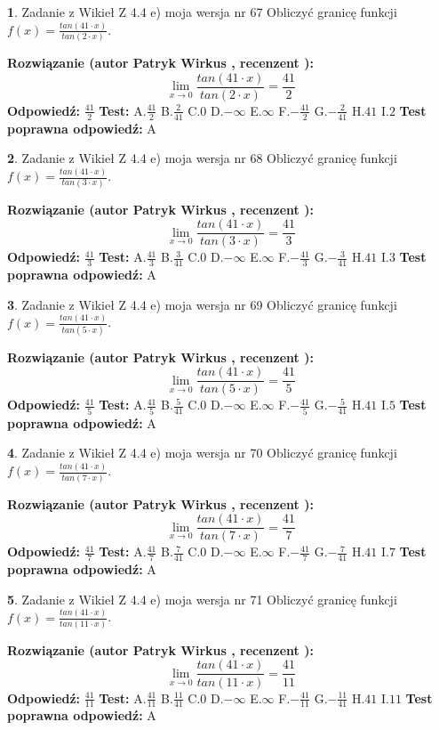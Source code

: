 \documentclass[12pt, a4paper]{article}
\theoremstyle{definition} %
\newtheorem{zad}{}
\newcommand{\zadStart}[1]{\begin{zad}#1\newline}
\newcommand{\zadStop}{\end{zad}}
\newcommand{\rozwStart}[2]{\noindent \textbf{Rozwiązanie (autor #1 , recenzent #2): }\newline}
\newcommand{\rozwStop}{\newline}
\newcommand{\odpStart}{\noindent \textbf{Odpowiedź:}\newline}
\newcommand{\odpStop}{\newline}
\newcommand{\testStart}{\noindent \textbf{Test:}\newline}
\newcommand{\testStop}{\newline}
\newcommand{\kluczStart}{\noindent \textbf{Test poprawna odpowiedź:}\newline}
\newcommand{\kluczStop}{\newline}
\begin{document}
\zadStart{Zadanie z Wikieł Z 4.4 e) moja wersja nr 67}
Obliczyć granicę funkcji $f(x)=\frac{tan(41\cdot x)}{tan(2\cdot x)}$.
\zadStop
\rozwStart{Patryk Wirkus}{}
$$\lim\limits_{x\to 0}\frac{tan(41\cdot x)}{tan(2\cdot x)}=
\frac{41}{2}$$
\rozwStop
\odpStart
$\frac{41}{2}$
\odpStop
\testStart
A.$\frac{41}{2}$
B.$\frac{2}{41}$
C.$0$
D.$-\infty$
E.$\infty$
F.$-\frac{41}{2}$
G.$-\frac{2}{41}$
H.$41$
I.$2$
\testStop
\kluczStart
A
\kluczStop



\zadStart{Zadanie z Wikieł Z 4.4 e) moja wersja nr 68}
Obliczyć granicę funkcji $f(x)=\frac{tan(41\cdot x)}{tan(3\cdot x)}$.
\zadStop
\rozwStart{Patryk Wirkus}{}
$$\lim\limits_{x\to 0}\frac{tan(41\cdot x)}{tan(3\cdot x)}=
\frac{41}{3}$$
\rozwStop
\odpStart
$\frac{41}{3}$
\odpStop
\testStart
A.$\frac{41}{3}$
B.$\frac{3}{41}$
C.$0$
D.$-\infty$
E.$\infty$
F.$-\frac{41}{3}$
G.$-\frac{3}{41}$
H.$41$
I.$3$
\testStop
\kluczStart
A
\kluczStop



\zadStart{Zadanie z Wikieł Z 4.4 e) moja wersja nr 69}
Obliczyć granicę funkcji $f(x)=\frac{tan(41\cdot x)}{tan(5\cdot x)}$.
\zadStop
\rozwStart{Patryk Wirkus}{}
$$\lim\limits_{x\to 0}\frac{tan(41\cdot x)}{tan(5\cdot x)}=
\frac{41}{5}$$
\rozwStop
\odpStart
$\frac{41}{5}$
\odpStop
\testStart
A.$\frac{41}{5}$
B.$\frac{5}{41}$
C.$0$
D.$-\infty$
E.$\infty$
F.$-\frac{41}{5}$
G.$-\frac{5}{41}$
H.$41$
I.$5$
\testStop
\kluczStart
A
\kluczStop



\zadStart{Zadanie z Wikieł Z 4.4 e) moja wersja nr 70}
Obliczyć granicę funkcji $f(x)=\frac{tan(41\cdot x)}{tan(7\cdot x)}$.
\zadStop
\rozwStart{Patryk Wirkus}{}
$$\lim\limits_{x\to 0}\frac{tan(41\cdot x)}{tan(7\cdot x)}=
\frac{41}{7}$$
\rozwStop
\odpStart
$\frac{41}{7}$
\odpStop
\testStart
A.$\frac{41}{7}$
B.$\frac{7}{41}$
C.$0$
D.$-\infty$
E.$\infty$
F.$-\frac{41}{7}$
G.$-\frac{7}{41}$
H.$41$
I.$7$
\testStop
\kluczStart
A
\kluczStop



\zadStart{Zadanie z Wikieł Z 4.4 e) moja wersja nr 71}
Obliczyć granicę funkcji $f(x)=\frac{tan(41\cdot x)}{tan(11\cdot x)}$.
\zadStop
\rozwStart{Patryk Wirkus}{}
$$\lim\limits_{x\to 0}\frac{tan(41\cdot x)}{tan(11\cdot x)}=
\frac{41}{11}$$
\rozwStop
\odpStart
$\frac{41}{11}$
\odpStop
\testStart
A.$\frac{41}{11}$
B.$\frac{11}{41}$
C.$0$
D.$-\infty$
E.$\infty$
F.$-\frac{41}{11}$
G.$-\frac{11}{41}$
H.$41$
I.$11$
\testStop
\kluczStart
A
\kluczStop
\end{document}
